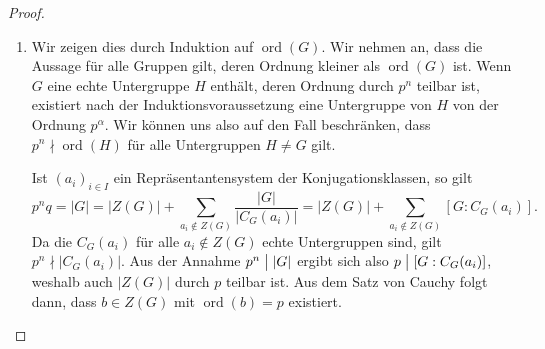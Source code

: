 \documentclass[12pt]{scrartcl} %
\DeclareMathOperator{\ord}{ord}
\newcommand{\divides}{\mathrel{\bigm|}}
\theoremstyle{definition}
\theoremstyle{remark}
\begin{document}
\begin{proof}
\begin{enumerate}
\item Wir zeigen dies durch Induktion auf $\ord(G)$.
	Wir nehmen an, dass die Aussage für alle Gruppen gilt, deren Ordnung kleiner als \(\ord(G)\) ist.
	Wenn \(G\) eine echte Untergruppe \(H\) enthält, deren Ordnung durch \(p^n\) teilbar ist, existiert nach der Induktionsvoraussetzung eine Untergruppe von \(H\) von der Ordnung $p^\alpha$.
	Wir können uns also auf den Fall beschränken, dass $p^n \nmid \ord(H)$ für alle Untergruppen $H\neq G$ gilt.

	Ist $(a_i)_{i \in I}$ ein Repräsentantensystem der Konjugationsklassen, so gilt
	\[p^nq = |G| = |Z(G)|+\sum_{a_{i}\notin Z(G)}\dfrac{|G|}{|C_{G}(a_{i})|} = |Z(G)|+\sum_{a_{i}\notin Z(G)}[G:C_G(a_i)].\]
	Da die \(C_G(a_i)\) für alle \(a_i \not\in Z(G)\) echte Untergruppen sind, gilt $p^n \nmid |C_G(a_i)|$.
	Aus der Annahme $p^n \divides |G|$ ergibt sich also \(p \divides [G:C_G(a_i)]\), weshalb auch $|Z(G)|$ durch \(p\) teilbar ist.
	Aus dem Satz von Cauchy folgt dann, dass $b \in Z(G)$ mit $\ord(b)=p$ existiert.


\end{enumerate}
\end{proof}
\end{document}
